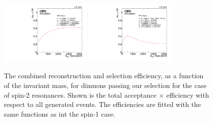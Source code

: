 \begin{figure}[htbp]
\centering
\includegraphics[width=0.4\textwidth]{Images/Cap5/AccEff_BB_RS.pdf}
\includegraphics[width=0.4\textwidth]{Images/Cap5/AccEff_BE_RS.pdf}
\caption{The combined reconstruction and selection efficiency, as a function of the invariant mass, for dimuons passing our selection for the case of spin-2 resonances. Shown is the total acceptance $\times$ efficiency with respect to all generated events. The efficiencies are fitted with the same functions as int the spin-1 case.}
\label{EffAccSpin2}
\end{figure}

